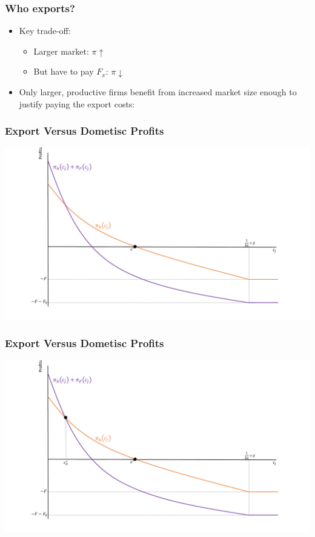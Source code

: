 \documentclass{beamer}
\begin{document}
\begin{frame}
	\frametitle{Who exports?}
	\begin{itemize}
	\item Key trade-off:
		\begin{itemize}
			\item Larger market: $\pi \uparrow$
			\item But have to pay $F_x$:  $\pi \downarrow$
		\end{itemize}
		\item Only larger, productive firms benefit from increased market size enough to justify paying the export costs:
		\end{itemize}
\end{frame}

\begin{frame}
				\frametitle{Export Versus Dometisc Profits}
				\includegraphics[scale=0.32]{SL4_8.pdf}
\end{frame}

\begin{frame}
	\frametitle{Export Versus Dometisc Profits}
	\includegraphics[scale=0.32]{SL4_9.pdf}
	
	
\end{frame}
\end{document}

